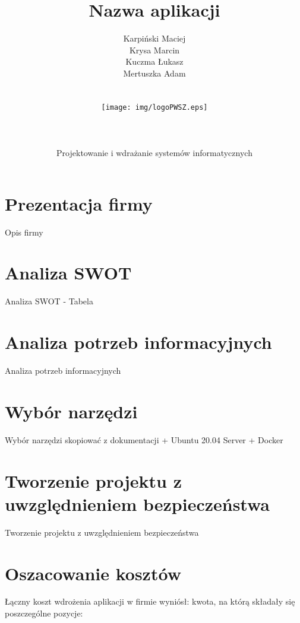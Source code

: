 \documentclass[12pt,a4paper]{article}
\author{Karpiński Maciej\\Krysa Marcin\\Kuczma Łukasz\\Mertuszka Adam\\\\\\\texttt{[image: img/logoPWSZ.eps]}\\\\\\\\Projektowanie i wdrażanie systemów informatycznych}
\title{Nazwa aplikacji}
\begin{document}
	\maketitle
	\thispagestyle{empty}
	\clearpage

	\tableofcontents
	\newpage

	\section{Prezentacja firmy}
		\indent Opis firmy
	\newpage

	\section{Analiza SWOT}
		\indent Analiza SWOT - Tabela
	\newpage
	
	\section{Analiza potrzeb informacyjnych}
		\indent Analiza potrzeb informacyjnych
	\newpage
	
	\section{Wybór narzędzi}
		\indent Wybór narzędzi skopiować z dokumentacji + Ubuntu 20.04 Server + Docker
	\newpage
	
	\section{Tworzenie projektu z uwzględnieniem bezpieczeństwa}
		\indent Tworzenie projektu z uwzględnieniem bezpieczeństwa
	\newpage
	
	\section{Oszacowanie kosztów}
		\indent Łączny koszt wdrożenia aplikacji w firmie wyniósł: kwota, na którą składały się poszczególne pozycje:
\end{document}
